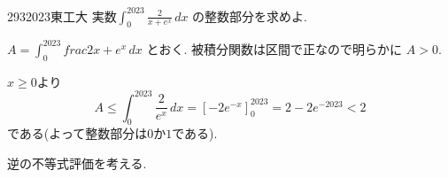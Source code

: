 \begin{thm}{293}{}{2023東工大}
実数$\displaystyle\int_{0}^{2023}\frac{2}{x+e^x}\, dx$ の整数部分を求めよ. 
\end{thm}

$A = \int_{0}^{2023} frac{2}{x+e^x}\, dx$ とおく. 被積分関数は区間で正なので明らかに $A>0$.

$x \geq 0$より 
\[
A \leq \int_{0}^{2023} \frac{2}{e^x} \, dx = [-2e^{-x}]_{0}^{2023} = 2 - 2e^{-2023} < 2
\]
である(よって整数部分は$0$か$1$である).

逆の不等式評価を考える. 